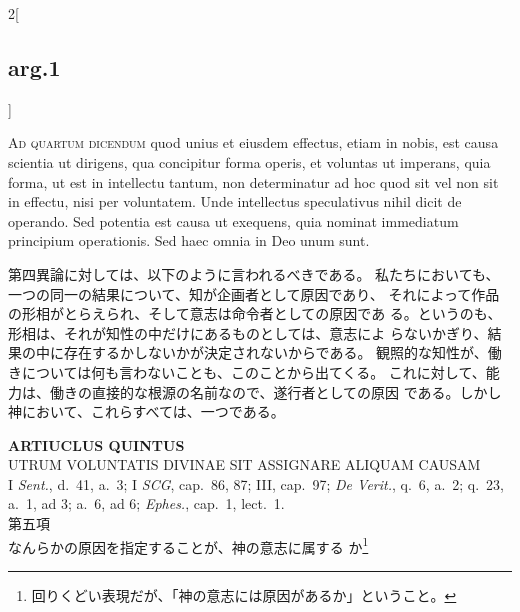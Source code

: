 \documentclass[paper=a4paper,fontsize=10pt,jafontsize=9pt,titlepage]{jlreq}
\begin{document}
\begin{paracol}{2}[\subsection{arg.1}]
\switchcolumn*[\subsection{ad.4}]


{\scshape Ad quartum dicendum} quod unius et eiusdem
 effectus, etiam in nobis, est causa scientia ut dirigens, qua
 concipitur forma operis, et voluntas ut imperans, quia forma, ut est in
 intellectu tantum, non determinatur ad hoc quod sit vel non sit in
 effectu, nisi per voluntatem. Unde intellectus speculativus nihil dicit
 de operando. Sed potentia est causa ut exequens, quia nominat
 immediatum principium operationis. Sed haec omnia in Deo unum sunt.

\switchcolumn

第四異論に対しては、以下のように言われるべきである。
私たちにおいても、一つの同一の結果について、知が企画者として原因であり、
 それによって作品の形相がとらえられ、そして意志は命令者としての原因であ
 る。というのも、形相は、それが知性の中だけにあるものとしては、意志によ
 らないかぎり、結果の中に存在するかしないかが決定されないからである。
観照的な知性が、働きについては何も言わないことも、このことから出てくる。
これに対して、能力は、働きの直接的な根源の名前なので、遂行者としての原因
 である。しかし神において、これらすべては、一つである。

\end{paracol}
\newpage



{}
\setcounter{section}{5}
\setcounter{subsection}{0}
\begin{center}
 {\Large {\bfseries ARTIUCLUS QUINTUS}}\\
 {\large UTRUM VOLUNTATIS DIVINAE SIT ASSIGNARE ALIQUAM CAUSAM}\\
 {\footnotesize I {\itshape Sent.}, d.~41, a.~3; I {\itshape SCG},
 cap.~86, 87; III, cap.~97; {\itshape De Verit.}, q.~6, a.~2; q.~23,
 a.~1, ad 3; a.~6, ad 6; {\itshape Ephes.}, cap.~1, lect.~1.}\\
 {\Large 第五項\\なんらかの原因を指定することが、神の意志に属する
 か}\footnote{回りくどい表現だが、「神の意志には原因があるか」ということ。}
\end{center}
\end{document}
